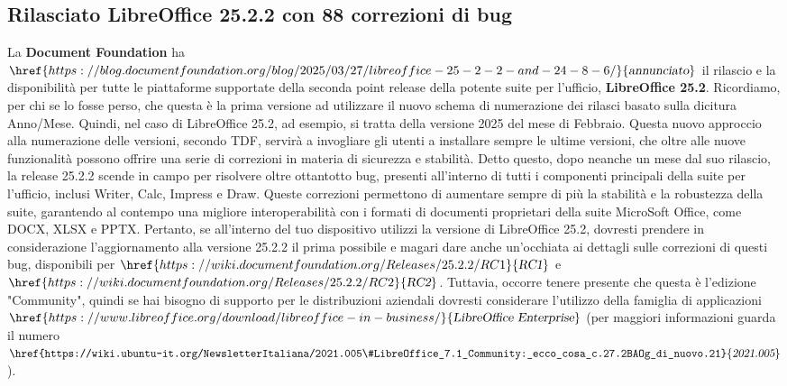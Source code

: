 \documentclass[a4paper,twoside]{article}
\begin{document}
\subsection{Rilasciato LibreOffice 25.2.2 con 88 correzioni di bug}
La \textbf{Document Foundation} ha $\href{https://blog.documentfoundation.org/blog/2025/03/27/libreoffice-25-2-2-and-24-8-6/}{\textsl{annunciato}}$ il rilascio e la disponibilità per tutte le piattaforme supportate della seconda point release della potente suite per l'ufficio, \textbf{LibreOffice 25.2}. Ricordiamo, per chi se lo fosse perso, che questa è la prima versione ad utilizzare il nuovo schema di numerazione dei rilasci basato sulla dicitura Anno/Mese. Quindi, nel caso di LibreOffice 25.2, ad esempio, si tratta della versione 2025 del mese di Febbraio. Questa nuovo approccio alla numerazione delle versioni, secondo TDF, servirà a invogliare gli utenti a installare sempre le ultime versioni, che oltre alle nuove funzionalità possono offrire una serie di correzioni in materia di sicurezza e stabilità.
Detto questo, dopo neanche un mese dal suo rilascio, la release 25.2.2 scende in campo per risolvere oltre ottantotto bug, presenti all'interno di tutti i componenti principali della suite per l'ufficio, inclusi Writer, Calc, Impress e Draw. Queste correzioni permettono di aumentare sempre di più la stabilità e la robustezza della suite, garantendo al contempo una migliore interoperabilità con i formati di documenti proprietari della suite MicroSoft Office, come DOCX, XLSX e PPTX. Pertanto, se all'interno del tuo dispositivo utilizzi la versione di LibreOffice 25.2, dovresti prendere in considerazione l'aggiornamento alla versione 25.2.2 il prima possibile e magari dare anche un'occhiata ai dettagli sulle correzioni di questi bug, disponibili per $\href{https://wiki.documentfoundation.org/Releases/25.2.2/RC1}{\textsl{RC1}}$ e $\href{https://wiki.documentfoundation.org/Releases/25.2.2/RC2}{\textsl{RC2}}$. Tuttavia, occorre tenere presente che questa è l'edizione "Community", quindi se hai bisogno di supporto per le distribuzioni aziendali dovresti considerare l'utilizzo della famiglia di applicazioni $\href{https://www.libreoffice.org/download/libreoffice-in-business/}{\textsl{LibreOffice Enterprise}}$ (per maggiori informazioni guarda il numero $\href{https://wiki.ubuntu-it.org/NewsletterItaliana/2021.005\#LibreOffice_7.1_Community:_ecco_cosa_c.27.2BAOg_di_nuovo.21}{\textsl{2021.005}}$).
\end{document}
